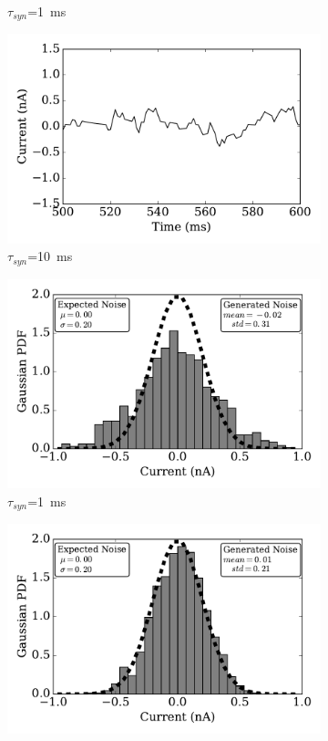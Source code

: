 \begin{figure}
\begin{subfigure}[t]{0.49\textwidth}
			\caption{$\tau_{syn}$=1~ms}
		\end{subfigure}
		\begin{subfigure}[t]{0.49\textwidth}
			\includegraphics[width=\textwidth]{pics_iconip/curr_tau10.pdf}
			\caption{$\tau_{syn}$=10~ms}
		\end{subfigure}
		\begin{subfigure}[t]{0.49\textwidth}
			\includegraphics[width=\textwidth]{pics_iconip/distr_tau1.pdf}
			\caption{$\tau_{syn}$=1~ms}
		\end{subfigure}
		\begin{subfigure}[t]{0.49\textwidth}
			\includegraphics[width=\textwidth]{pics_iconip/distr_tau10.pdf}

\end{subfigure}
\end{figure}
